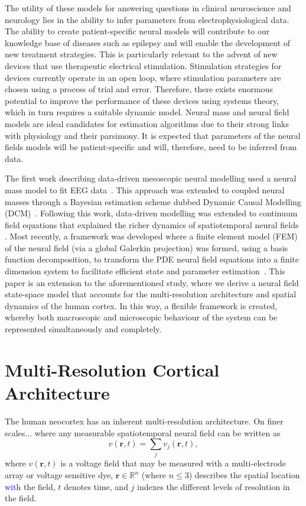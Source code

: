 \documentclass[11pt,draftcls,onecolumn,peerreview]{IEEEtran}
\newcommand{\parham}[1]{\textcolor{blue}{#1}}
\begin{document}
The utility of these models for answering questions in clinical neuroscience and neurology lies in the ability to infer parameters from electrophysiological data. The ability to create patient-specific neural models will contribute to our knowledge base of diseases such as epilepsy and will enable the development of new treatment strategies. This is particularly relevant to the advent of new devices that use therapeutic electrical stimulation. Stimulation strategies for devices currently operate in an open loop, where stimulation parameters are chosen using a process of trial and error. Therefore, there exists enormous potential to improve the performance of these devices using systems theory, which in turn requires a suitable dynamic model. Neural mass and neural field models are ideal candidates for estimation algorithms due to their strong links with physiology and their parsimony. It is expected that parameters of the neural fields models will be patient-specific and will, therefore, need to be inferred from data.

The first work describing data-driven mesoscopic neural modelling used a neural mass model to fit EEG data~\cite{Valdes1999}. This approach was extended to coupled neural masses through a Bayesian estimation scheme dubbed Dynamic Causal Modelling (DCM)~\cite{David2003}. Following this work, data-driven modelling was extended to continuum field equations that explained the richer dynamics of spatiotemporal neural fields \cite{Galka2008,schiff2008kalman,Daunizeau2009}. Most recently, a framework was developed where a finite element model (FEM) of the neural field (via a global Galerkin projection) was formed, using a basis function decomposition, to transform the PDE neural field equations into a finite dimension system to facilitate efficient state and parameter estimation~\cite{Freestone2011}. This paper is an extension to the aforementioned study, where we derive a neural field state-space model that accounts for the multi-resolution architecture and spatial dynamics of the human cortex. In this way, a flexible framework is created, whereby both macroscopic and microscopic behaviour of the system can be represented simultaneously and completely.

\section{Multi-Resolution Cortical Architecture}
The human neocortex has an inherent multi-resolution architecture. On finer scales... where any measurable spatiotemporal neural field can be written as 
\begin{equation}
	v\left(\mathbf{r},t\right) = \sum_{j} v_j\left(\mathbf{r},t\right),
\end{equation}
where $v\left(\mathbf{r},t\right)$ is a voltage field that may be measured with a multi-electrode array or voltage sensitive dye, $\mathbf{r}\in \mathbb{R}^n$ (where $n\le3$) describes the spatial location \parham{with} the field, $t$ denotes time, and $j$ indexes the different levels of resolution in the field. 
\end{document}
